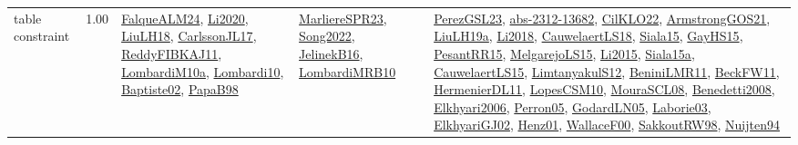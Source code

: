 {\begin{longtable}{p{3cm}r>{\raggedright\arraybackslash}p{6cm}>{\raggedright\arraybackslash}p{6cm}>{\raggedright\arraybackslash}p{8cm}}
\index{table constraint}\index{Constraints!table constraint}table constraint &  1.00 & \hyperref[detail:FalqueALM24]{FalqueALM24}, \hyperref[detail:Li2020]{Li2020}, \hyperref[detail:LiuLH18]{LiuLH18}, \hyperref[detail:CarlssonJL17]{CarlssonJL17}, \hyperref[detail:ReddyFIBKAJ11]{ReddyFIBKAJ11}, \hyperref[detail:LombardiM10a]{LombardiM10a}, \hyperref[detail:Lombardi10]{Lombardi10}, \hyperref[detail:Baptiste02]{Baptiste02}, \hyperref[detail:PapaB98]{PapaB98} & \hyperref[detail:MarliereSPR23]{MarliereSPR23}, \hyperref[detail:Song2022]{Song2022}, \hyperref[detail:JelinekB16]{JelinekB16}, \hyperref[detail:LombardiMRB10]{LombardiMRB10} & \hyperref[detail:PerezGSL23]{PerezGSL23}, \hyperref[detail:abs-2312-13682]{abs-2312-13682}, \hyperref[detail:CilKLO22]{CilKLO22}, \hyperref[detail:ArmstrongGOS21]{ArmstrongGOS21}, \hyperref[detail:LiuLH19a]{LiuLH19a}, \hyperref[detail:Li2018]{Li2018}, \hyperref[detail:CauwelaertLS18]{CauwelaertLS18}, \hyperref[detail:Siala15]{Siala15}, \hyperref[detail:GayHS15]{GayHS15}, \hyperref[detail:PesantRR15]{PesantRR15}, \hyperref[detail:MelgarejoLS15]{MelgarejoLS15}, \hyperref[detail:Li2015]{Li2015}, \hyperref[detail:Siala15a]{Siala15a}, \hyperref[detail:CauwelaertLS15]{CauwelaertLS15}, \hyperref[detail:LimtanyakulS12]{LimtanyakulS12}, \hyperref[detail:BeniniLMR11]{BeniniLMR11}, \hyperref[detail:BeckFW11]{BeckFW11}, \hyperref[detail:HermenierDL11]{HermenierDL11}, \hyperref[detail:LopesCSM10]{LopesCSM10}, \hyperref[detail:MouraSCL08]{MouraSCL08}, \hyperref[detail:Benedetti2008]{Benedetti2008}, \hyperref[detail:Elkhyari2006]{Elkhyari2006}, \hyperref[detail:Perron05]{Perron05}, \hyperref[detail:GodardLN05]{GodardLN05}, \hyperref[detail:Laborie03]{Laborie03}, \hyperref[detail:ElkhyariGJ02]{ElkhyariGJ02}, \hyperref[detail:Henz01]{Henz01}, \hyperref[detail:WallaceF00]{WallaceF00}, \hyperref[detail:SakkoutRW98]{SakkoutRW98}, \hyperref[detail:Nuijten94]{Nuijten94}\\
\end{longtable}
}

\clearpage
